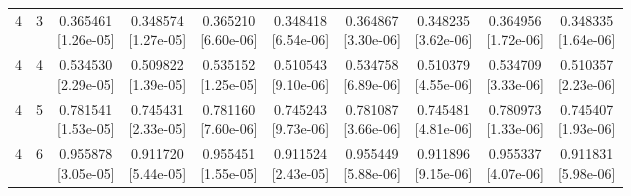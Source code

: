 \documentclass[12pt,letterpaper]{article}
\theoremstyle{plain}
\theoremstyle{definition}
\begin{document}
\begin{table}[p]
\begin{adjustbox}{max width=\linewidth}
\begin{tabular}{@{}rr*{8}{c}@{}}
4 & 3 & \shortstack{0.365461\\[-1pt]{\scriptsize[1.26e-05]}} & \shortstack{0.348574\\[-1pt]{\scriptsize[1.27e-05]}} & \shortstack{0.365210\\[-1pt]{\scriptsize[6.60e-06]}} & \shortstack{0.348418\\[-1pt]{\scriptsize[6.54e-06]}} & \shortstack{0.364867\\[-1pt]{\scriptsize[3.30e-06]}} & \shortstack{0.348235\\[-1pt]{\scriptsize[3.62e-06]}} & \shortstack{0.364956\\[-1pt]{\scriptsize[1.72e-06]}} & \shortstack{0.348335\\[-1pt]{\scriptsize[1.64e-06]}}\\
4 & 4 & \shortstack{0.534530\\[-1pt]{\scriptsize[2.29e-05]}} & \shortstack{0.509822\\[-1pt]{\scriptsize[1.39e-05]}} & \shortstack{0.535152\\[-1pt]{\scriptsize[1.25e-05]}} & \shortstack{0.510543\\[-1pt]{\scriptsize[9.10e-06]}} & \shortstack{0.534758\\[-1pt]{\scriptsize[6.89e-06]}} & \shortstack{0.510379\\[-1pt]{\scriptsize[4.55e-06]}} & \shortstack{0.534709\\[-1pt]{\scriptsize[3.33e-06]}} & \shortstack{0.510357\\[-1pt]{\scriptsize[2.23e-06]}}\\
4 & 5 & \shortstack{0.781541\\[-1pt]{\scriptsize[1.53e-05]}} & \shortstack{0.745431\\[-1pt]{\scriptsize[2.33e-05]}} & \shortstack{0.781160\\[-1pt]{\scriptsize[7.60e-06]}} & \shortstack{0.745243\\[-1pt]{\scriptsize[9.73e-06]}} & \shortstack{0.781087\\[-1pt]{\scriptsize[3.66e-06]}} & \shortstack{0.745481\\[-1pt]{\scriptsize[4.81e-06]}} & \shortstack{0.780973\\[-1pt]{\scriptsize[1.33e-06]}} & \shortstack{0.745407\\[-1pt]{\scriptsize[1.93e-06]}}\\
4 & 6 & \shortstack{0.955878\\[-1pt]{\scriptsize[3.05e-05]}} & \shortstack{0.911720\\[-1pt]{\scriptsize[5.44e-05]}} & \shortstack{0.955451\\[-1pt]{\scriptsize[1.55e-05]}} & \shortstack{0.911524\\[-1pt]{\scriptsize[2.43e-05]}} & \shortstack{0.955449\\[-1pt]{\scriptsize[5.88e-06]}} & \shortstack{0.911896\\[-1pt]{\scriptsize[9.15e-06]}} & \shortstack{0.955337\\[-1pt]{\scriptsize[4.07e-06]}} & \shortstack{0.911831\\[-1pt]{\scriptsize[5.98e-06]}}\\

\end{tabular}
\end{adjustbox}
\end{table}
\end{document}
